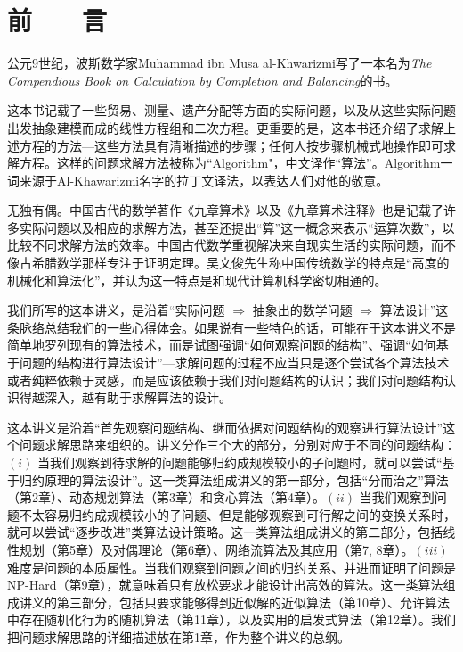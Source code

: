 \chapter[{前言}]{前　　言}
\vspace{2mm}
\setcounter{page}{1}

公元9世纪，波斯数学家Muhammad ibn Musa al-Khwarizmi写了一本名为{\it The Compendious Book on Calculation by Completion and Balancing}的书。

这本书记载了一些贸易、测量、遗产分配等方面的实际问题，以及从这些实际问题出发抽象建模而成的线性方程组和二次方程。更重要的是，这本书还介绍了求解上述方程的方法---这些方法具有清晰描述的步骤；任何人按步骤机械式地操作即可求解方程。这样的问题求解方法被称为``Algorithm"，中文译作“算法”。Algorithm一词来源于Al-Khawarizmi名字的拉丁文译法，以表达人们对他的敬意。

无独有偶。中国古代的数学著作《九章算术》以及《九章算术注释》也是记载了许多实际问题以及相应的求解方法，甚至还提出“算”这一概念来表示“运算次数”，以比较不同求解方法的效率。中国古代数学重视解决来自现实生活的实际问题，而不像古希腊数学那样专注于证明定理。吴文俊先生称中国传统数学的特点是“高度的机械化和算法化”，并认为这一特点是和现代计算机科学密切相通的。

我们所写的这本讲义，是沿着“实际问题 $\Rightarrow$ 抽象出的数学问题 $\Rightarrow$ 算法设计”这条脉络总结我们的一些心得体会。如果说有一些特色的话，可能在于这本讲义不是简单地罗列现有的算法技术，而是试图强调“如何观察问题的结构”、强调“如何基于问题的结构进行算法设计”---求解问题的过程不应当只是逐个尝试各个算法技术或者纯粹依赖于灵感，而是应该依赖于我们对问题结构的认识；我们对问题结构认识得越深入，越有助于求解算法的设计。

这本讲义是沿着“首先观察问题结构、继而依据对问题结构的观察进行算法设计”这个问题求解思路来组织的。讲义分作三个大的部分，分别对应于不同的问题结构：$(i)$ 当我们观察到待求解的问题能够归约成规模较小的子问题时，就可以尝试“基于归约原理的算法设计”。这一类算法组成讲义的第一部分，包括“分而治之”算法（第2章）、动态规划算法（第3章）和贪心算法（第4章）。$(ii)$ 当我们观察到问题不太容易归约成规模较小的子问题、但是能够观察到可行解之间的变换关系时，就可以尝试“逐步改进”类算法设计策略。这一类算法组成讲义的第二部分，包括线性规划（第5章）及对偶理论（第6章）、网络流算法及其应用（第7, 8章）。$(iii)$ 难度是问题的本质属性。当我们观察到问题之间的归约关系、并进而证明了问题是NP-Hard（第9章），就意味着只有放松要求才能设计出高效的算法。这一类算法组成讲义的第三部分，包括只要求能够得到近似解的近似算法（第10章）、允许算法中存在随机化行为的随机算法（第11章），以及实用的启发式算法（第12章）。我们把问题求解思路的详细描述放在第1章，作为整个讲义的总纲。


